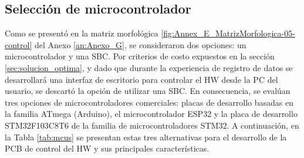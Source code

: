     \subsection{Selección de microcontrolador}
    \label{subsec:sel_micro}

        \noindent
        Como se presentó en la matriz morfológica \ref{fig:Annex_E_MatrizMorfologica-05-control} del Anexo \ref{an:Anexo_G}, se consideraron dos opciones: un microcontrolador y una \ac{SBC}. Por criterios de costo expuestos en la sección \ref{sec:solucion_optima}, y dado que durante la experiencia de registro de datos se desarrollará una interfaz de escritorio para controlar el \ac{HW} desde la \ac{PC} del usuario, se descartó la opción de utilizar una \ac{SBC}. En consecuencia, se evalúan tres opciones de microcontroladores comerciales: placas de desarrollo basadas en la familia ATmega (Arduino), el microcontrolador ESP32 y la placa de desarrollo STM32F103C8T6 de la familia de microcontroladores STM32. A continuación, en la Tabla \ref{tab:mcus} se presentan estas tres alternativas para el desarrollo de la PCB de control del \ac{HW} y sus principales características.
        
